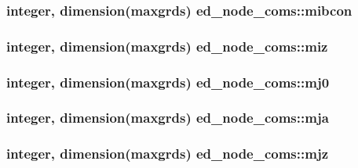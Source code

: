 \subsubsection[{mibcon}]{\setlength{\rightskip}{0pt plus 5cm}integer, dimension(maxgrds) ed\+\_\+node\+\_\+coms\+::mibcon}\label{namespaceed__node__coms_af8cf428b242766c5d3114bd5053ce26d}
\hypertarget{namespaceed__node__coms_a84a2e967ef52e0e39e711d4eef30683e}{}
\subsubsection[{miz}]{\setlength{\rightskip}{0pt plus 5cm}integer, dimension(maxgrds) ed\+\_\+node\+\_\+coms\+::miz}\label{namespaceed__node__coms_a84a2e967ef52e0e39e711d4eef30683e}
\hypertarget{namespaceed__node__coms_ad774b942f26ad9d0946e2b3be5e69851}{}
\subsubsection[{mj0}]{\setlength{\rightskip}{0pt plus 5cm}integer, dimension(maxgrds) ed\+\_\+node\+\_\+coms\+::mj0}\label{namespaceed__node__coms_ad774b942f26ad9d0946e2b3be5e69851}
\hypertarget{namespaceed__node__coms_a7c23d30331ab985adf33e7e0abaca9d7}{}
\subsubsection[{mja}]{\setlength{\rightskip}{0pt plus 5cm}integer, dimension(maxgrds) ed\+\_\+node\+\_\+coms\+::mja}\label{namespaceed__node__coms_a7c23d30331ab985adf33e7e0abaca9d7}
\hypertarget{namespaceed__node__coms_aa271449af5bbb67875d63c1c3a974905}{}
\subsubsection[{mjz}]{\setlength{\rightskip}{0pt plus 5cm}integer, dimension(maxgrds) ed\+\_\+node\+\_\+coms\+::mjz}\label{namespaceed__node__coms_aa271449af5bbb67875d63c1c3a974905}
\hypertarget{namespaceed__node__coms_a0a26786e048c93181d52c25d73142af6}{}
